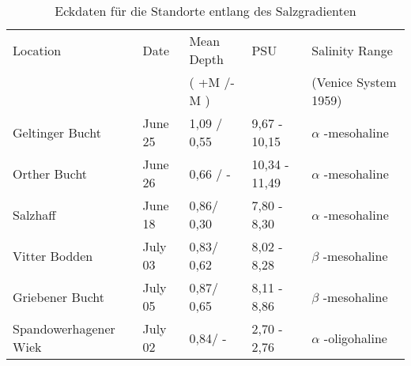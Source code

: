 \begin{table}[htb]{\textwidth}
\caption{Eckdaten für die Standorte entlang des Salzgradienten}
\begin{tabular}{lllll}
\toprule
 Location				& Date		& Mean Depth	& PSU 			& Salinity Range   \\
 						& 			& ( +M /-M )	& 				& (Venice System 1959)\\
\midrule
Geltinger Bucht 		& June 25	& 1,09 / 0,55	& 9,67 - 10,15 	& $ \alpha $ -mesohaline\\ 
Orther Bucht			& June 26 	& 0,66 / -		& 10,34 - 11,49 & $ \alpha $ -mesohaline\\
Salzhaff 				& June 18 	& 0,86/ 0,30	& 7,80 - 8,30  	& $ \alpha $ -mesohaline\\
\midrule
Vitter Bodden			& July 03 	& 0,83/ 0,62	& 8,02 - 8,28  	& $ \beta $ -mesohaline\\
Griebener Bucht			& July 05 	& 0,87/ 0,65	& 8,11 - 8,86	& $ \beta $ -mesohaline\\
\midrule
Spandowerhagener Wiek 	& July 02 	& 0,84/ -		& 2,70 - 2,76  	& $ \alpha $ -oligohaline\\
\bottomrule
\end{tabular}
\label{Salztabelle}
\end{table}


